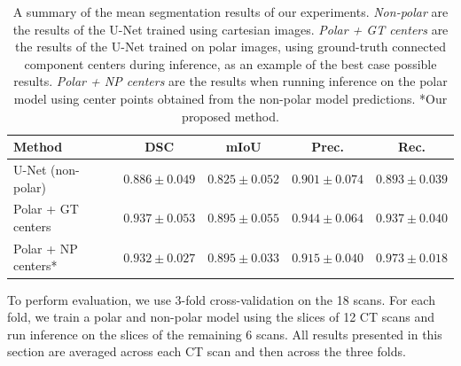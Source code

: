 \begin{table}[h]
\def\arraystretch{1.2}
\centering
\begin{tabularx}{\linewidth}{X c c c c} 
 \textbf{Method} & \textbf{DSC} & \textbf{mIoU} & \textbf{Prec.} & \textbf{Rec.} \\ 
 \hline
U-Net (non-polar) & $0.886 \pm 0.049$ & $0.825 \pm 0.052$ & $0.901 \pm 0.074$ & $0.893 \pm 0.039$ \\
Polar + GT centers & $0.937 \pm 0.053$ & $0.895 \pm 0.055$ & $0.944 \pm 0.064$ & $0.937 \pm 0.040$ \\
Polar + NP centers* & $0.932 \pm 0.027$ & $0.895 \pm 0.033$ & $0.915 \pm 0.040$ & $0.973 \pm 0.018$ \\
\end{tabularx}
\caption{A summary of the mean segmentation results of our experiments. \textit{Non-polar} are the results of the U-Net trained using cartesian images. \textit{Polar + GT centers} are the results of the U-Net trained on polar images, using ground-truth connected component centers during inference, as an example of the best case possible results. \textit{Polar + NP centers} are the results when running inference on the polar model using center points obtained from the non-polar model predictions. *Our proposed method.}
\label{table:results}
\end{table}

To perform evaluation, we use 3-fold cross-validation on the 18 scans. For each fold, we train a polar and non-polar model using the slices of 12 CT scans and run inference on the slices of the remaining 6 scans. All results presented in this section are averaged across each CT scan and then across the three folds.

